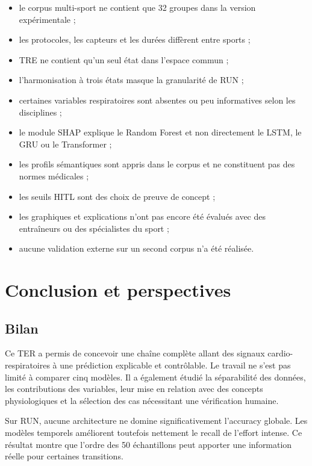 \documentclass[12pt,a4paper]{article}
\begin{document}
\begin{itemize}[leftmargin=1.5em]
  \item le corpus multi-sport ne contient que 32 groupes dans la version
  expérimentale ;
  \item les protocoles, les capteurs et les durées diffèrent entre sports ;
  \item TRE ne contient qu'un seul état dans l'espace commun ;
  \item l'harmonisation à trois états masque la granularité de RUN ;
  \item certaines variables respiratoires sont absentes ou peu informatives
  selon les disciplines ;
  \item le module SHAP explique le Random Forest et non directement le LSTM,
  le GRU ou le Transformer ;
  \item les profils sémantiques sont appris dans le corpus et ne constituent
  pas des normes médicales ;
  \item les seuils HITL sont des choix de preuve de concept ;
  \item les graphiques et explications n'ont pas encore été évalués avec des
  entraîneurs ou des spécialistes du sport ;
  \item aucune validation externe sur un second corpus n'a été réalisée.
\end{itemize}


\section{Conclusion et perspectives}
\label{sec:conclusion}

\subsection{Bilan}

Ce TER a permis de concevoir une chaîne complète allant des signaux
cardio-respiratoires à une prédiction explicable et contrôlable. Le travail ne
s'est pas limité à comparer cinq modèles. Il a également étudié la
séparabilité des données, les contributions des variables, leur mise en
relation avec des concepts physiologiques et la sélection des cas nécessitant
une vérification humaine.

Sur RUN, aucune architecture ne domine significativement l'accuracy globale.
Les modèles temporels améliorent toutefois nettement le recall de l'effort
intense. Ce résultat montre que l'ordre des 50 échantillons peut apporter une
information réelle pour certaines transitions.
\end{document}
